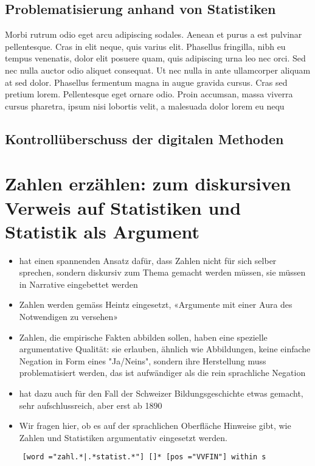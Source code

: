 \subsection{Problematisierung anhand von Statistiken}
Morbi rutrum odio eget arcu adipiscing sodales. Aenean et purus a est pulvinar pellentesque. Cras in elit neque, quis varius elit. Phasellus fringilla, nibh eu tempus venenatis, dolor elit posuere quam, quis adipiscing urna leo nec orci. Sed nec nulla auctor odio aliquet consequat. Ut nec nulla in ante ullamcorper aliquam at sed dolor. Phasellus fermentum magna in augue gravida cursus. Cras sed pretium lorem. Pellentesque eget ornare odio. Proin accumsan, massa viverra cursus pharetra, ipsum nisi lobortis velit, a malesuada dolor lorem eu nequ


\subsection{Kontrollüberschuss der digitalen Methoden}


\section{Zahlen erzählen: zum diskursiven Verweis auf Statistiken und Statistik als Argument}

\begin{itemize}
    \item\cite{espeland_narrating_2015} hat einen spannenden Ansatz dafür, dass Zahlen nicht für sich selber sprechen, sondern diskursiv zum Thema gemacht werden müssen, sie müssen in Narrative eingebettet werden
    \item Zahlen werden gemäss Heintz eingesetzt, «Argumente mit einer Aura des Notwendigen zu versehen»
    \item Zahlen, die empirische Fakten abbilden sollen, haben eine spezielle argumentative Qualität: sie erlauben, ähnlich wie Abbildungen, keine einfache Negation in Form eines "Ja/Neins", sondern ihre Herstellung muss problematisiert werden, das ist aufwändiger als die rein sprachliche Negation \cite[78]{heintz_zahlen_2007} 
    \item \cite{ruoss_zahlen_2018} hat dazu auch für den Fall der Schweizer Bildungsgeschichte etwas gemacht, sehr aufschlussreich, aber erst ab 1890
    \item Wir fragen hier, ob es auf der sprachlichen Oberfläche Hinweise gibt, wie Zahlen und Statistiken argumentativ eingesetzt werden. 
\end{itemize}

\begin{verbatim}
    [word ="zahl.*|.*statist.*"] []* [pos ="VVFIN"] within s
\end{verbatim}